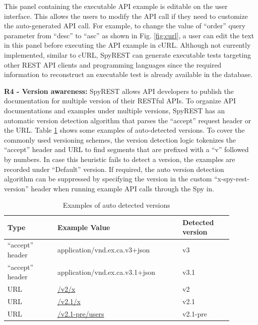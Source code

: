\documentclass[conference]{IEEEtran}
\begin{document}
This panel containing the executable API example is editable on the user interface. This allows the users to modify the API call if they need to customize the auto-generated API call. For example, to change the value of ``order'' query parameter from ``desc'' to ``asc''  as shown in Fig. \ref{fig:curl}, a user can edit the text in this panel before executing the API example in cURL. Although not currently implemented, similar to cURL, SpyREST can generate executable tests targeting other REST API clients and programming languages since the required information to reconstruct an executable test is already available in the database.

\textbf{R4 - Version awareness:} SpyREST allows API developers to publish the documentation for multiple version of their RESTful APIs. To organize API documentations and examples under multiple versions, SpyREST has an automatic version detection algorithm that parses the ``accept'' request header or the URL. Table \ref{table:versions} shows some examples of auto-detected versions. To cover the commonly used versioning schemes, the version detection logic tokenizes the ``accept'' header and URL to find segments that are prefixed with a ``v'' followed by numbers. In case this heuristic fails to detect a version, the examples are recorded under ``Default'' version. If required, the auto version detection algorithm can be suppressed by specifying the version in the custom ``x-spy-rest-version'' header when running example API calls through the Spy in.

\begin{table}[!tbh]
  \caption{Examples of auto detected versions}
  \begin{tabular}{|p{0.2\linewidth}|p{0.5\linewidth}|p{0.2\linewidth}|}
    \hline
    Type & Example Value & Detected version\\
    \hline
    ``accept'' header & application/vnd.ex.ca.v3+json & v3\\
    \hline
    ``accept'' header & application/vnd.ex.ca.v3.1+json & v3.1\\
    \hline
    URL & \url{/v2/x} & v2\\
    \hline
    URL & \url{/v2.1/x} & v2.1\\
    \hline
    URL & \url{/v2.1-pre/users} & v2.1-pre\\
    \hline
  \end{tabular}
  \label{table:versions}
\end{table}
\end{document}
